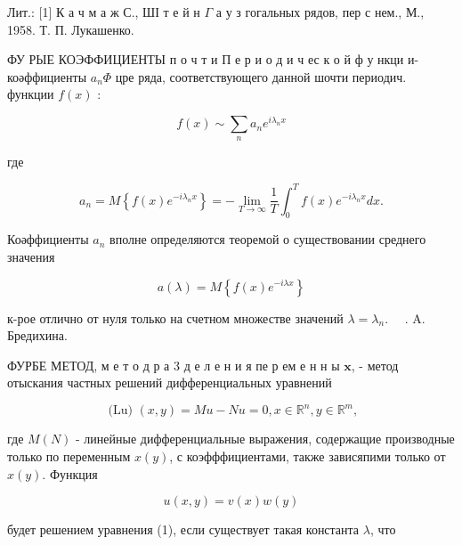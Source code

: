 \documentclass[10pt]{article}
\begin{document}
Лит.: [1] К а ч м а ж С., ШІ т е й н $\Gamma$ а у з гогальных рядов, пер с нем., М., 1958. Т. П. Лукашенко.



ФУ РЫЕ КОЭФФИЦИЕНТЫ п о ч т и П е р и о д и ч ес к о й ф у нкци и-коәффициенты $a_{n} \Phi$ цре ряда, соответствующего данной шочти периодич. функции $f(x)$ :



\[

f(x) \sim \sum_{n} a_{n} e^{i \lambda_{n} x}

\]



где



\[

a_{n}=M\left\{f(x) e^{-i \lambda_{n} x}\right\}=-\lim _{T \rightarrow \infty} \frac{1}{T} \int_{0}^{T} f(x) e^{-i \lambda_{n} x} d x .

\]



Коәффициенты $a_{n}$ вполне определяются теоремой о существовании среднего значения



\[

a(\lambda)=M\left\{f(x) e^{-i \lambda x}\right\}

\]



к-рое отлично от нуля только на счетном множестве значений $\lambda=\lambda_{n}$. $\quad$. A. Бредихина.



ФУРБЕ МЕТОД, м е т о д р а 3 д е л е н и я пе р ем е н н ы $\mathbf{x}$, - метод отыскания частных решений дифференциальных уравнений



\[

\text { (Lu) }(x, y)=M u-N u=0, x \in \mathbb{R}^{n}, y \in \mathbb{R}^{m},

\]



где $M(N)$ - линейные дифференциальные выражения, содержащие производные только по переменным $x(y)$, с коэфффициентами, также зависяпими только от $x(y)$. Функция



\[

u(x, y)=v(x) w(y)

\]



будет решением уравнения (1), если существует такая константа $\lambda$, что
\end{document}
